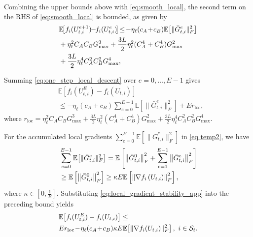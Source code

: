 \documentclass[lettersize,journal]{IEEEtran}
\begin{document}
	Combining the upper bounds above with \eqref{eq:smooth_local}, the second term on the RHS of \eqref{eq:smooth_local} is bounded, as given by
	\begin{align}
		&\mathbb{E}\!\!
		\left[
		f_i(U_{t,i}^{e+1})\!\!-\!\!f_i(U_{t,i}^{e})
		\!\right]
		\!\le\!
		-\eta_{\ell}(c_A\!+\!c_B)\mathbb{E}
		\!\left[
		\|\bar{G}_{t,i}^{e}\|_F^2
		\right]
		\notag\\
		&+\eta_{\ell}^{2}C_AC_BG_{\max}^{3}+\frac{3L}{2}\eta_{\ell}^{2}(C_A^{4}+C_B^{4})G_{\max}^{2}
		\nonumber\\
		&+\frac{3L}{2}\eta_{\ell}^{4}
		C_A^{2}C_B^{2}G_{\max}^{4},
		\label{eq:one_step_local_descent}
	\end{align}
	
	Summing \eqref{eq:one_step_local_descent} over
	$e=0,\ldots,E-1$ gives
	\begin{align} \label{eq temp2}
		&\mathbb{E}\!\left[f_i(U_{t,i}^{E})-f_i(U_{t,i})\right] \nonumber \\
		&\le
		-\eta_{\ell}(c_A+c_B)
		\sum_{e=0}^{E-1}\mathbb{E}\!\left[\|\bar{G}_{t,i}^{e}\|_F^2\right]+E r_{\mathrm{loc}},
	\end{align}
	where $r_{\mathrm{loc}}=
	\eta_{\ell}^{2}C_AC_BG_{\max}^{3}
	+\frac{3L}{2}\eta_{\ell}^{2}(C_A^{4}+C_B^{4})G_{\max}^{2}
	+\frac{3L}{2}\eta_{\ell}^{4}C_A^{2}C_B^{2}G_{\max}^{4}$.
	
	For the accumulated local gradients $\sum_{e=0}^{E-1}
	\mathbb{E}\!\left[\|\bar{G}_{t,i}^{e}\|_F^2\right]$ in \eqref{eq temp2}, we have
	\begin{align}
		&\sum_{e=0}^{E-1} \mathbb{E}\!\left[\|\bar{G}_{t,i}^{e}\|_F^2\right]
		=\mathbb{E}\left[\left\|\bar{G}_{t, i}^0\right\|_F^2+\sum_{e=1}^{E-1}\left\|\bar{G}_{t, i}^e\right\|_F^2\right]
		\notag\\
		&\geq \mathbb{E}\left[\left\|\bar{G}_{t, i}^0\right\|_F^2 \right]
		\geq {\kappa}{E}
		\mathbb{E}\left[\left\|\nabla f_i\left(U_{t, i}\right)\right\|_F^2 \right],
		\label{eq:local_gradient_stability_app}
	\end{align}
	where $\kappa \in [0,\frac{1}{E}]$. Substituting \eqref{eq:local_gradient_stability_app}
	into the preceding bound yields
	\begin{align}
		&\mathbb{E}\!\left[f_i(U_{t,i}^{E})-f_i(U_{t,i})\right]
		\le \notag\\
		&E r_{\mathrm{loc}}\!-\!\eta_{\ell}(c_A\!+\!c_B)\kappa E
		\mathbb{E}\!\left[\|\nabla f_i(U_{t,i})\|_F^2\right],
		\ i\in\mathcal{S}_t.
		\label{eq:local_descent_total}
	\end{align}
	
\end{document}
